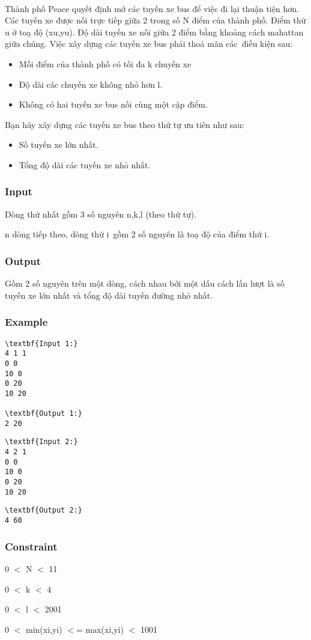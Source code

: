 

 

Thành phố Peace quyết định mở các tuyến xe bus để việc đi lại thuận tiện hơn. Các tuyến xe được nối trực tiếp giữa 2 trong số N điểm của thành phố. Điểm thứ u ở toạ độ (xu,yu). Độ dài tuyến xe nối giữa 2 điểm bằng khoảng cách mahattan giữa chúng. Việc xây dựng các tuyến xe bus phải thoả mãn các điều kiện sau:
\begin{itemize}
	\item Mỗi điểm của thành phố có tối đa k chuyến xe
	\item Độ dài các chuyến xe không nhỏ hơn l.
	\item Không có hai tuyến xe bus nối cùng một cặp điểm.
\end{itemize}

Bạn hãy xây dựng các tuyến xe bus theo thứ tự ưu tiên như sau:
\begin{itemize}
	\item Số tuyến xe lớn nhất.
	\item Tổng độ dài các tuyến xe nhỏ nhất.
\end{itemize}

\subsubsection{Input}

Dòng thứ nhất gồm 3 số nguyên n,k,l (theo thứ tự).

n dòng tiếp theo, dòng thứ i gồm 2 số nguyên là toạ độ của điểm thứ i.

\subsubsection{Output}

Gồm 2 số nguyên trên một dòng, cách nhau bởi một dấu cách lần lượt là số tuyến xe lớn nhất và tổng độ dài tuyến đường nhỏ nhất.

\subsubsection{Example}
\begin{verbatim}
\textbf{Input 1:}
4 1 1
0 0
10 0
0 20
10 20

\textbf{Output 1:}
2 20\end{verbatim}
\begin{verbatim}
\textbf{Input 2:}
4 2 1
0 0
10 0
0 20
10 20\end{verbatim}
\begin{verbatim}
\textbf{Output 2:}
4 60\end{verbatim}

\subsubsection{Constraint}

0 $<$ N $<$ 11

0 $<$ k $<$ 4

0 $<$ l $<$ 2001

0 $<$ min(xi,yi) $<$= max(xi,yi) $<$ 1001